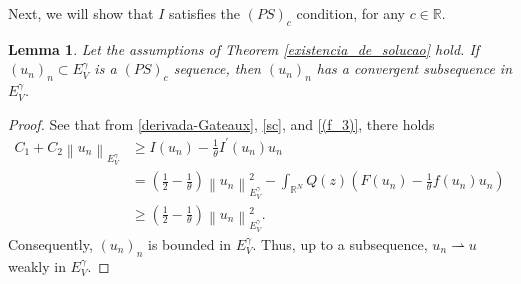 \documentclass[12pt]{amsart}
\newtheorem{lemma}[theorem]{Lemma}
\begin{document}
Next, we will show that $I$ satisfies the $(PS)_c$ condition, for any $c \in \mathbb{R}$.


\begin{lemma}\label{PS}
	Let the assumptions of Theorem \ref{existencia_de_solucao} hold. If $(u_n)_n \subset E_V^\gamma$ is a $(PS)_c$ sequence, then $(u_n)_n$ has a convergent subsequence in $E_V^\gamma$.
\end{lemma}


\begin{proof}
	See that from \eqref{derivada-Gateaux}, \eqref{sc},  and \ref{(f_3)}, there holds
$$
	\begin{aligned}
		C_1+C_2\left\|u_n\right\|_{E_V^\gamma} &\geq I\left(u_n\right)-\frac{1}{\theta} I^{\prime}\left(u_n\right)u_n 
		\\
		&= \left(\frac{1}{2}-\frac{1}{\theta}\right)\left\|u_n\right\|_{E_V^\gamma}^2 - \int_{\mathbb{R}^N} Q(z)\left(F\left(u_n\right)-\frac{1}{\theta} f\left(u_n\right) u_n\right)
		\\
		& \geq \left(\frac{1}{2}-\frac{1}{\theta}\right)\left\|u_n\right\|_{E_V^\gamma}^2.
	\end{aligned}
	$$
Consequently, $(u_n)_n$ is bounded in $E_V^\gamma$. Thus, up to a subsequence, $u_n \rightharpoonup u$ weakly in $E_V^\gamma$.


\end{proof}
\end{document}
